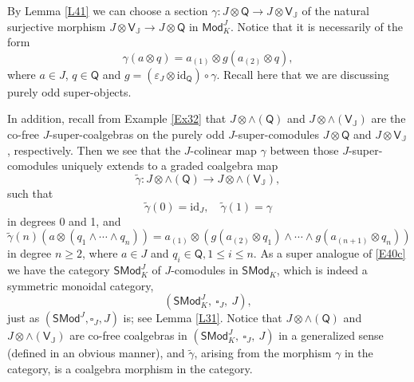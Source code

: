 \documentclass[11pt, a4paper]{amsart}
\theoremstyle{definition}
\numberwithin{equation}{section}
\begin{document}
By Lemma \ref{L41} we can choose a section $\gamma: J \otimes \mathsf{Q} \to J \otimes \mathsf{V}_{\mathbb{J}}$ of the natural surjective morphism $J \otimes \mathsf{V}_{\mathbb{J}} \to J \otimes \mathsf{Q}$ in $\mathsf{Mod}_{K}^{J}$.
Notice that it is necessarily of the form
\[ \gamma(a \otimes q) = a_{(1)} \otimes g(a_{(2)} \otimes q), \]
where $a \in J$, $q \in \mathsf{Q}$ and $g = (\varepsilon_{J} \otimes \mathrm{id}_{\mathsf{Q}}) \circ \gamma$.
Recall here that we are discussing purely odd super-objects.

In addition, recall from Example \ref{Ex32} that 
$J \otimes \wedge(\mathsf{Q})$ and $J \otimes \wedge(\mathsf{V}_{\mathbb{J}})$ 
are the co-free $J$-super-coalgebras on the purely odd $J$-super-comodules $J\otimes \mathsf{Q}$ and
$J\otimes \mathsf{V}_{\mathbb{J}}$, respectively. 
Then we see that the $J$-colinear map $\gamma$ between those $J$-super-comodules uniquely extends to a graded coalgebra map
\[ \widetilde{\gamma}: J \otimes \wedge(\mathsf{Q}) \to J \otimes \wedge(\mathsf{V}_{\mathbb{J}}), \]
such that
\[ \widetilde{\gamma}(0) = \mathrm{id}_{J},\quad \widetilde{\gamma}(1) =\gamma \]
in degrees 0 and 1, and
\[ \widetilde{\gamma}(n)(a \otimes (q_{1} \wedge \cdots \wedge q_{n})) = a_{(1)} \otimes (g(a_{(2)} \otimes q_{1}) \wedge \cdots \wedge g(a_{(n+1)} \otimes q_{n})) \]
in degree $n \geq 2$, where $a \in J$ and $q_{i} \in \mathsf{Q}, 1 \leq i \leq n$.
As a super analogue of \eqref{E40c} we have the category $\mathsf{SMod}_{K}^{J}$ of $J$-comodules
in $\mathsf{SMod}_{K}$, which is indeed a symmetric monoidal category,
\begin{equation}\label{E41a}
(\mathsf{SMod}_{K}^{J},\ \square_{J},\ J),
\end{equation}
just as $(\mathsf{SMod}^{J}, \square_J, J)$ is; see Lemma \ref{L31}. 
Notice that $J \otimes \wedge(\mathsf{Q})$ and $J \otimes \wedge(\mathsf{V}_{\mathbb{J}})$ are
co-free coalgebras in $(\mathsf{SMod}_{K}^{J},\ \square_{J},\ J)$ in a generalized sense 
(defined in an obvious manner), and 
$\widetilde{\gamma}$, arising from the morphism $\gamma$ in the category, is a coalgebra morphism in the category. 
\end{document}
